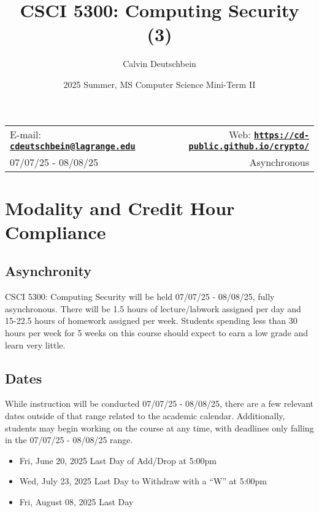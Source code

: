 \documentclass[11pt]{article}
\title{CSCI 5300: Computing Security (3)}
\author{Calvin Deutschbein}
\date{2025 Summer, MS Computer Science Mini-Term II}
\newcommand{\blankline}{\quad\pagebreak[2]}
\begin{document}
\maketitle

\blankline

\begin{tabular*}{\textwidth}{@{\extracolsep{\fill}}lr}


E-mail: \href{mailto:cdeutschbein@lagrange.edu}{\tt\bf cdeutschbein@lagrange.edu} & Web: \href{https://cd-public.github.io/crypto/}{\tt\bf https://cd-public.github.io/crypto/}  \\

07/07/25 - 08/08/25 &  Asynchronous \\
\hline
\end{tabular*}

\vspace{5 mm}


\section*{Modality and Credit Hour Compliance}


\subsection*{Asynchronity} 

CSCI 5300: Computing Security will be held 07/07/25 - 08/08/25, fully asynchronous.  There will be 1.5 hours of lecture/labwork assigned per day and 15-22.5 hours of homework assigned per week. Students spending less than 30 hours per week for 5 weeks on this course should expect to earn a low grade and learn very little. 

\subsection*{Dates}

While instruction will be conducted  07/07/25 - 08/08/25, there are a few relevant dates outside of that range related to the academic calendar. Additionally, students may begin working on the course at any time, with deadlines only falling in the  07/07/25 - 08/08/25 range.

\begin{itemize}
	\item Fri, June 20, 2025 Last Day of Add/Drop at 5:00pm
	\item Wed, July 23, 2025 Last Day to Withdraw with a “W” at 5:00pm
	\item Fri, August 08, 2025 Last Day
\end{itemize}
\end{document}
